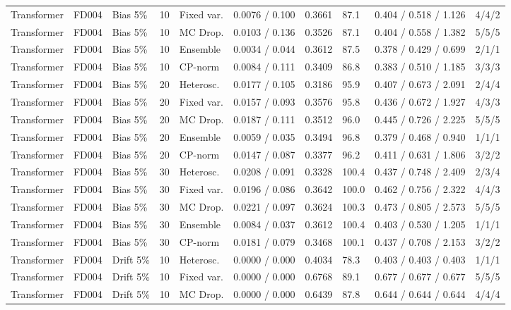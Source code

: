 \documentclass[10pt,a4paper]{article}
\begin{document}
\begin{landscape}
\begin{center}
\begin{longtable}{lllllcclll}
Transformer & FD004 & Bias 5\% & 10 & Fixed var. & 0.0076 / 0.100 & 0.3661 & 87.1 & 0.404 / 0.518 / 1.126 & 4/4/2 \\
Transformer & FD004 & Bias 5\% & 10 & MC Drop. & 0.0103 / 0.136 & 0.3526 & 87.1 & 0.404 / 0.558 / 1.382 & 5/5/5 \\
Transformer & FD004 & Bias 5\% & 10 & Ensemble & 0.0034 / 0.044 & 0.3612 & 87.5 & 0.378 / 0.429 / 0.699 & 2/1/1 \\
Transformer & FD004 & Bias 5\% & 10 & CP-norm & 0.0084 / 0.111 & 0.3409 & 86.8 & 0.383 / 0.510 / 1.185 & 3/3/3 \\
Transformer & FD004 & Bias 5\% & 20 & Heterosc. & 0.0177 / 0.105 & 0.3186 & 95.9 & 0.407 / 0.673 / 2.091 & 2/4/4 \\
Transformer & FD004 & Bias 5\% & 20 & Fixed var. & 0.0157 / 0.093 & 0.3576 & 95.8 & 0.436 / 0.672 / 1.927 & 4/3/3 \\
Transformer & FD004 & Bias 5\% & 20 & MC Drop. & 0.0187 / 0.111 & 0.3512 & 96.0 & 0.445 / 0.726 / 2.225 & 5/5/5 \\
Transformer & FD004 & Bias 5\% & 20 & Ensemble & 0.0059 / 0.035 & 0.3494 & 96.8 & 0.379 / 0.468 / 0.940 & 1/1/1 \\
Transformer & FD004 & Bias 5\% & 20 & CP-norm & 0.0147 / 0.087 & 0.3377 & 96.2 & 0.411 / 0.631 / 1.806 & 3/2/2 \\
Transformer & FD004 & Bias 5\% & 30 & Heterosc. & 0.0208 / 0.091 & 0.3328 & 100.4 & 0.437 / 0.748 / 2.409 & 2/3/4 \\
Transformer & FD004 & Bias 5\% & 30 & Fixed var. & 0.0196 / 0.086 & 0.3642 & 100.0 & 0.462 / 0.756 / 2.322 & 4/4/3 \\
Transformer & FD004 & Bias 5\% & 30 & MC Drop. & 0.0221 / 0.097 & 0.3624 & 100.3 & 0.473 / 0.805 / 2.573 & 5/5/5 \\
Transformer & FD004 & Bias 5\% & 30 & Ensemble & 0.0084 / 0.037 & 0.3612 & 100.4 & 0.403 / 0.530 / 1.205 & 1/1/1 \\
Transformer & FD004 & Bias 5\% & 30 & CP-norm & 0.0181 / 0.079 & 0.3468 & 100.1 & 0.437 / 0.708 / 2.153 & 3/2/2 \\
Transformer & FD004 & Drift 5\% & 10 & Heterosc. & 0.0000 / 0.000 & 0.4034 & 78.3 & 0.403 / 0.403 / 0.403 & 1/1/1 \\
Transformer & FD004 & Drift 5\% & 10 & Fixed var. & 0.0000 / 0.000 & 0.6768 & 89.1 & 0.677 / 0.677 / 0.677 & 5/5/5 \\
Transformer & FD004 & Drift 5\% & 10 & MC Drop. & 0.0000 / 0.000 & 0.6439 & 87.8 & 0.644 / 0.644 / 0.644 & 4/4/4 \\

\end{longtable}
\end{center}
\end{landscape}
\end{document}
